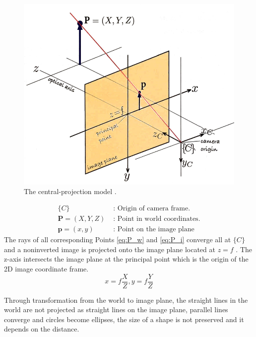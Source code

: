 \documentclass[journal,final,a4paper,twoside]{PS}
\begin{document}
\begin{figure}[h]
\begin{center}
\includegraphics[scale=0.5]{./pics/CenterProjectionModel.png}
\caption{The central-projection model \cite{Corke}.}
\label{fig:projectionModel}
\end{center}
\end{figure}
\begin{subequations}
\begin{align}
\{C\}&\text{ : Origin of camera frame.}\label{eq:C_origin}\\
\textbf{P}=\left( X,Y,Z\right)&\text{ : Point in world coordinates.}\label{eq:P_w}\\
\textbf{p}=(x,y)&\text{ : Point on the image plane}\label{eq:P_i}
\end{align}
\end{subequations}
The rays of all corresponding Points \ref{eq:P_w} and \ref{eq:P_i} converge all at $\{C\}$ and a noninverted image is projected onto the image plane located at $z=f$ \cite{Ma:2010}. The z-axis intersects the image plane at the principal point which is the origin of the 2D image coordinate frame.
\begin{equation}
x=f\frac{X}{Z}, y=f\frac{Y}{Z}
\end{equation}

Through transformation from the world to image plane, the straight lines in the world are not projected as straight lines on the image plane, parallel lines converge and circles become ellipses, the size of a shape is not preserved and it depends on the distance.
\end{document}
